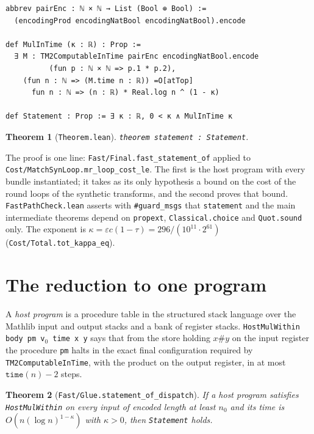 \documentclass[11pt]{amsart}
\newtheorem{theorem}{Theorem}
\theoremstyle{remark}
\begin{document}
\begin{lstlisting}
abbrev pairEnc : ℕ × ℕ → List (Bool ⊕ Bool) :=
  (encodingProd encodingNatBool encodingNatBool).encode

def MulInTime (κ : ℝ) : Prop :=
  ∃ M : TM2ComputableInTime pairEnc encodingNatBool.encode
          (fun p : ℕ × ℕ => p.1 * p.2),
    (fun n : ℕ => (M.time n : ℝ)) =O[atTop]
      fun n : ℕ => (n : ℝ) * Real.log n ^ (1 - κ)

def Statement : Prop := ∃ κ : ℝ, 0 < κ ∧ MulInTime κ
\end{lstlisting}

\begin{theorem}[\texttt{Theorem.lean}]
\texttt{theorem statement : Statement}.
\end{theorem}

The proof is one line: \texttt{Fast/Final.fast\_statement\_of} applied to
\texttt{Cost/MatchSynLoop.mr\_loop\_cost\_le}. The first is the host program with every bundle
instantiated; it takes as its only hypothesis a bound on the cost of the round loops of the
synthetic transforms, and the second proves that bound. \texttt{FastPathCheck.lean} asserts with
\texttt{\#guard\_msgs} that \texttt{statement} and the main intermediate theorems depend on
\texttt{propext}, \texttt{Classical.choice} and \texttt{Quot.sound} only. The exponent is
$\kappa=\varepsilon c(1-\tau)=296/(10^{11}\cdot 2^{61})$ (\texttt{Cost/Total.tot\_kappa\_eq}).

\section{The reduction to one program}

A \emph{host program} is a procedure table in the structured stack language over the Mathlib
input and output stacks and a bank of register stacks. \texttt{HostMulWithin body pm v$_0$ time x
y} says that from the store holding $x\#y$ on the input register the procedure \texttt{pm}
halts in the exact final configuration required by \texttt{TM2ComputableInTime}, with the
product on the output register, in at most $\texttt{time}(n)-2$ steps.

\begin{theorem}[\texttt{Fast/Glue.statement\_of\_dispatch}]
If a host program satisfies \texttt{HostMulWithin} on every input of encoded length at least
$n_0$ and its time is $O(n(\log n)^{1-\kappa})$ with $\kappa>0$, then \texttt{Statement} holds.
\end{theorem}
\end{document}
